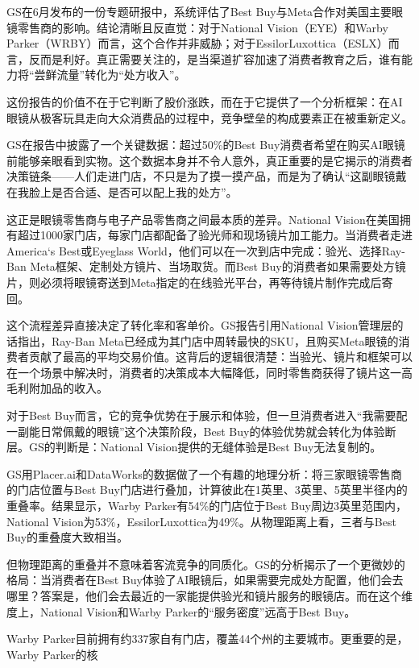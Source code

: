 \documentclass[11pt]{ctexart}
\begin{document}
GS在6月发布的一份专题研报中，系统评估了Best Buy与Meta合作对美国主要眼镜零售商的影响。结论清晰且反直觉：对于National Vision（EYE）和Warby Parker（WRBY）而言，这个合作并非威胁；对于EssilorLuxottica（ESLX）而言，反而是利好。真正需要关注的，是当渠道扩容加速了消费者教育之后，谁有能力将“尝鲜流量”转化为“处方收入”。

这份报告的价值不在于它判断了股价涨跌，而在于它提供了一个分析框架：在AI眼镜从极客玩具走向大众消费品的过程中，竞争壁垒的构成要素正在被重新定义。

GS在报告中披露了一个关键数据：超过50\%的Best Buy消费者希望在购买AI眼镜前能够亲眼看到实物。这个数据本身并不令人意外，真正重要的是它揭示的消费者决策链条——人们走进门店，不只是为了摸一摸产品，而是为了确认“这副眼镜戴在我脸上是否合适、是否可以配上我的处方”。

这正是眼镜零售商与电子产品零售商之间最本质的差异。National Vision在美国拥有超过1000家门店，每家门店都配备了验光师和现场镜片加工能力。当消费者走进America‘s Best或Eyeglass World，他们可以在一次到店中完成：验光、选择Ray-Ban Meta框架、定制处方镜片、当场取货。而Best Buy的消费者如果需要处方镜片，则必须将眼镜寄送到Meta指定的在线验光平台，再等待镜片制作完成后寄回。

这个流程差异直接决定了转化率和客单价。GS报告引用National Vision管理层的话指出，Ray-Ban Meta已经成为其门店中周转最快的SKU，且购买Meta眼镜的消费者贡献了最高的平均交易价值。这背后的逻辑很清楚：当验光、镜片和框架可以在一个场景中解决时，消费者的决策成本大幅降低，同时零售商获得了镜片这一高毛利附加品的收入。

对于Best Buy而言，它的竞争优势在于展示和体验，但一旦消费者进入“我需要配一副能日常佩戴的眼镜”这个决策阶段，Best Buy的体验优势就会转化为体验断层。GS的判断是：National Vision提供的无缝体验是Best Buy无法复制的。

GS用Placer.ai和DataWorks的数据做了一个有趣的地理分析：将三家眼镜零售商的门店位置与Best Buy门店进行叠加，计算彼此在1英里、3英里、5英里半径内的重叠率。结果显示，Warby Parker有54\%的门店位于Best Buy周边3英里范围内，National Vision为53\%，EssilorLuxottica为49\%。从物理距离上看，三者与Best Buy的重叠度大致相当。

但物理距离的重叠并不意味着客流竞争的同质化。GS的分析揭示了一个更微妙的格局：当消费者在Best Buy体验了AI眼镜后，如果需要完成处方配置，他们会去哪里？答案是，他们会去最近的一家能提供验光和镜片服务的眼镜店。而在这个维度上，National Vision和Warby Parker的“服务密度”远高于Best Buy。

Warby Parker目前拥有约337家自有门店，覆盖44个州的主要城市。更重要的是，Warby Parker的核
\end{document}
